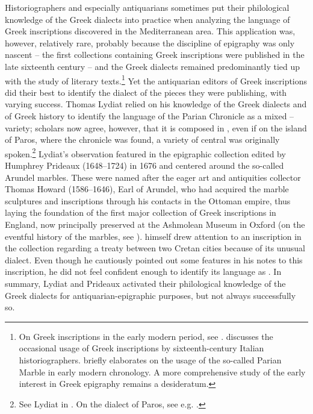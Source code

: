 Historiographers and especially antiquarians sometimes put their philological knowledge of the Greek dialects into practice when analyzing the language of Greek inscriptions discovered in the Mediterranean area. This application was, however, relatively rare, probably because the discipline of epigraphy was only nascent – the first collections containing Greek inscriptions were published in the late sixteenth century – and the Greek dialects remained predominantly tied up with the study of literary texts.\footnote{On Greek inscriptions in the early modern period, see \citet{Stenhouse_greekness_nodate}. \citet{Stenhouse2005} discusses the occasional usage of Greek inscriptions by sixteenth-century Italian historiographers. \citet{Liddel2014} briefly elaborates on the usage of the so-called Parian Marble in early modern chronology. A more comprehensive study of the early interest in Greek epigraphy remains a desideratum.} Yet the antiquarian editors of Greek inscriptions did their best to identify the dialect of the pieces they were publishing, with varying success. Thomas Lydiat relied on his knowledge of the Greek dialects and of Greek history to identify the language of the Parian Chronicle as a mixed – variety; scholars now agree, however, that it is composed in , even if on the island of Paros, where the chronicle was found, a variety of central  was originally spoken.\footnote{See Lydiat in \citet[\textsc{ii}.116–117]{Prideaux1676}. On the dialect of Paros, see e.g. \citet[531]{Alonso2018}.} Lydiat’s observation featured in the epigraphic collection edited by Humphrey Prideaux (1648–1724) in 1676 and centered around the so-called Arundel marbles. These were named after the eager art and antiquities collector Thomas Howard (1586–1646), Earl of Arundel, who had acquired the marble sculptures and inscriptions through his contacts in the Ottoman empire, thus laying the foundation of the first major collection of Greek inscriptions in England, now principally preserved at the Ashmolean Museum in Oxford (on the eventful history of the marbles, see \citealt{Vickers2006}). \citet[\textsc{i.}a.1\textsc{\textsuperscript{v}}, 123]{Prideaux1676} himself drew attention to an inscription in the collection regarding a treaty between two Cretan cities because of its unusual dialect. Even though he cautiously pointed out some  features in his notes to this inscription, he did not feel confident enough to identify its language as . In summary, Lydiat and Prideaux activated their philological knowledge of the Greek dialects for antiquarian-epigraphic purposes, but not always successfully so.

